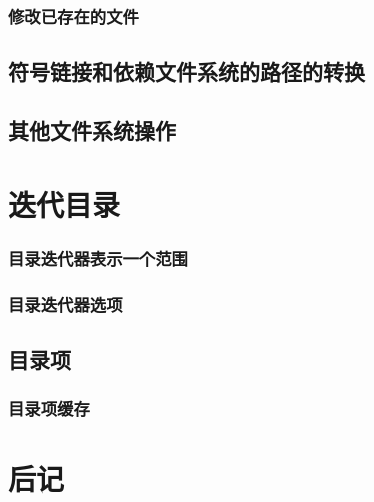 \subsubsection{修改已存在的文件}

\subsection{符号链接和依赖文件系统的路径的转换}\label{ch20.4.5}

\subsection{其他文件系统操作}


\section{迭代目录}
\subsubsection{目录迭代器表示一个范围}
\subsubsection{目录迭代器选项}

\subsection{目录项}
\subsubsection{目录项缓存}


\section{后记}